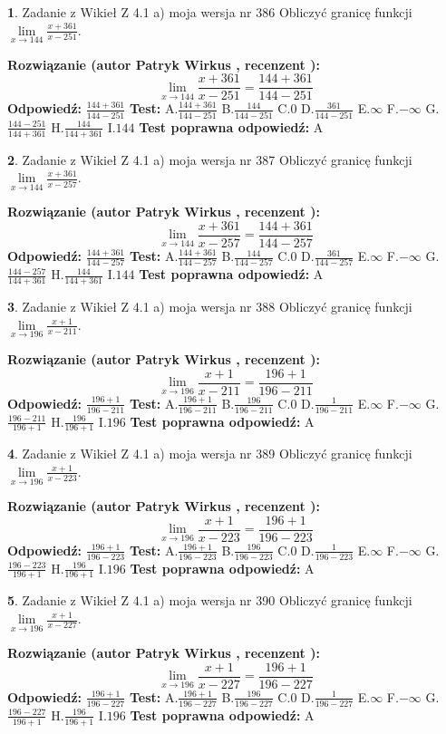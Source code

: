 \documentclass[12pt, a4paper]{article}
\theoremstyle{definition} %
\newtheorem{zad}{}
\newcommand{\zadStart}[1]{\begin{zad}#1\newline}
\newcommand{\zadStop}{\end{zad}}
\newcommand{\rozwStart}[2]{\noindent \textbf{Rozwiązanie (autor #1 , recenzent #2): }\newline}
\newcommand{\rozwStop}{\newline}
\newcommand{\odpStart}{\noindent \textbf{Odpowiedź:}\newline}
\newcommand{\odpStop}{\newline}
\newcommand{\testStart}{\noindent \textbf{Test:}\newline}
\newcommand{\testStop}{\newline}
\newcommand{\kluczStart}{\noindent \textbf{Test poprawna odpowiedź:}\newline}
\newcommand{\kluczStop}{\newline}
\begin{document}
\zadStart{Zadanie z Wikieł Z 4.1 a) moja wersja nr 386}
Obliczyć granicę funkcji $\lim\limits_{x\to144}\frac{x+361}{x-251}$.
\zadStop
\rozwStart{Patryk Wirkus}{}
$$\lim\limits_{x\to144}\frac{x+361}{x-251} = \frac{144+361}{144-251}$$
\rozwStop
\odpStart
$\frac{144+361}{144-251}$
\odpStop
\testStart
A.$\frac{144+361}{144-251}$
B.$\frac{144}{144-251}$
C.$0$
D.$\frac{361}{144-251}$
E.$\infty$
F.$-\infty$
G.$\frac{144-251}{144+361}$
H.$\frac{144}{144+361}$
I.$144$
\testStop
\kluczStart
A
\kluczStop



\zadStart{Zadanie z Wikieł Z 4.1 a) moja wersja nr 387}
Obliczyć granicę funkcji $\lim\limits_{x\to144}\frac{x+361}{x-257}$.
\zadStop
\rozwStart{Patryk Wirkus}{}
$$\lim\limits_{x\to144}\frac{x+361}{x-257} = \frac{144+361}{144-257}$$
\rozwStop
\odpStart
$\frac{144+361}{144-257}$
\odpStop
\testStart
A.$\frac{144+361}{144-257}$
B.$\frac{144}{144-257}$
C.$0$
D.$\frac{361}{144-257}$
E.$\infty$
F.$-\infty$
G.$\frac{144-257}{144+361}$
H.$\frac{144}{144+361}$
I.$144$
\testStop
\kluczStart
A
\kluczStop



\zadStart{Zadanie z Wikieł Z 4.1 a) moja wersja nr 388}
Obliczyć granicę funkcji $\lim\limits_{x\to196}\frac{x+1}{x-211}$.
\zadStop
\rozwStart{Patryk Wirkus}{}
$$\lim\limits_{x\to196}\frac{x+1}{x-211} = \frac{196+1}{196-211}$$
\rozwStop
\odpStart
$\frac{196+1}{196-211}$
\odpStop
\testStart
A.$\frac{196+1}{196-211}$
B.$\frac{196}{196-211}$
C.$0$
D.$\frac{1}{196-211}$
E.$\infty$
F.$-\infty$
G.$\frac{196-211}{196+1}$
H.$\frac{196}{196+1}$
I.$196$
\testStop
\kluczStart
A
\kluczStop



\zadStart{Zadanie z Wikieł Z 4.1 a) moja wersja nr 389}
Obliczyć granicę funkcji $\lim\limits_{x\to196}\frac{x+1}{x-223}$.
\zadStop
\rozwStart{Patryk Wirkus}{}
$$\lim\limits_{x\to196}\frac{x+1}{x-223} = \frac{196+1}{196-223}$$
\rozwStop
\odpStart
$\frac{196+1}{196-223}$
\odpStop
\testStart
A.$\frac{196+1}{196-223}$
B.$\frac{196}{196-223}$
C.$0$
D.$\frac{1}{196-223}$
E.$\infty$
F.$-\infty$
G.$\frac{196-223}{196+1}$
H.$\frac{196}{196+1}$
I.$196$
\testStop
\kluczStart
A
\kluczStop



\zadStart{Zadanie z Wikieł Z 4.1 a) moja wersja nr 390}
Obliczyć granicę funkcji $\lim\limits_{x\to196}\frac{x+1}{x-227}$.
\zadStop
\rozwStart{Patryk Wirkus}{}
$$\lim\limits_{x\to196}\frac{x+1}{x-227} = \frac{196+1}{196-227}$$
\rozwStop
\odpStart
$\frac{196+1}{196-227}$
\odpStop
\testStart
A.$\frac{196+1}{196-227}$
B.$\frac{196}{196-227}$
C.$0$
D.$\frac{1}{196-227}$
E.$\infty$
F.$-\infty$
G.$\frac{196-227}{196+1}$
H.$\frac{196}{196+1}$
I.$196$
\testStop
\kluczStart
A
\kluczStop
\end{document}

